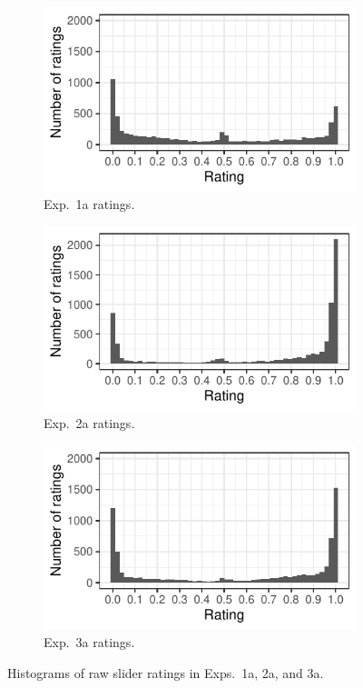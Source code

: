 \documentclass[11pt,fleqn]{article}
\newcommand{\6}{\mbox{$[\hspace*{-.6mm}[$}}
\newcommand{\9}{\mbox{$]\hspace*{-.6mm}]$}}
\begin{document}
\begin{figure}[h!]
\begin{subfigure}{.33\textwidth}
\includegraphics[width=\textwidth]{../../results/5-projectivity-no-fact/graphs/bunching}
\caption{Exp.~1a ratings.}
\label{fig:exp1araw}
\end{subfigure}
\begin{subfigure}{.33\textwidth}
\includegraphics[width=\textwidth]{../../results/4-veridicality3/graphs/bunching}
\caption{Exp.~2a ratings.}
\label{fig:exp2araw}
\end{subfigure}
\begin{subfigure}{.33\textwidth}
\includegraphics[width=\textwidth]{../../results/2-veridicality2/graphs/bunching}
\caption{Exp.~3a ratings.}
\label{fig:exp3araw}
\end{subfigure}
\caption{Histograms of raw slider ratings in Exps.~1a, 2a, and 3a.}
\label{fig:bunch}
\end{figure}
\end{document}
